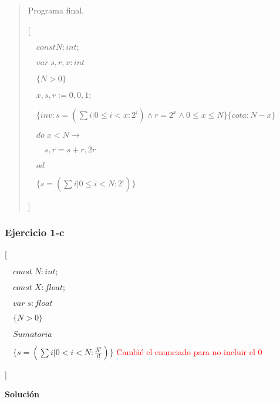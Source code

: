 \documentclass[hidelinks]{article}
\newenvironment{absolutelynopagebreak}
{\Needspace{10\baselineskip}\begin{quote}}
		{\end{quote}}
\begin{document}
\begin{absolutelynopagebreak}
	Programa final.\par

	[\par
		$\quad const N: int;$\par
		$\quad var \; s,r,x: int$\par
		$\quad\{N > 0\}$\par
		$\quad x,s,r := 0,0,1;$\par
		$\quad\{inv: s = (\sum i| 0\leq i < x :2^i) \land r = 2^x \land 0 \leq x \leq N\}\{cota: N-x\}$\par
		$\quad do \; x < N \rightarrow $ \par
		$\qquad s,r = s + r,2r $ \par
		$\quad od $ \par
		$\quad \{s = (\sum i| 0\leq i < N :2^i)\}$ \par
	]
\end{absolutelynopagebreak}

\newpage


\subsubsection{Ejercicio 1-c}

[\par
	$\quad const \; N: int;$\par
	$\quad const \; X: float;$\par
	$\quad var \; s: float$\par
	$\quad\{N > 0\}$\par
	$\quad Sumatoria $ \par
	$\quad \{s = (\sum i| 0 < i < N : \frac{X^i}{i!})\}$ \textcolor{red}{Cambié el enunciado para no incluir el 0} \par
]

\textbf{Solución}
\end{document}
